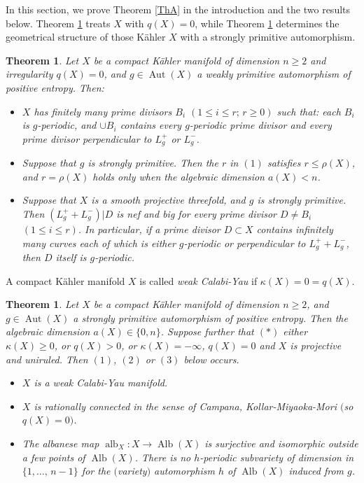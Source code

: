 \documentclass[11pt,a4paper,psamsfonts]{amsart}
\theoremstyle{plain}
\newtheorem{theorem}[thm]{Theorem}
\theoremstyle{definition}
\theoremstyle{remark}
\begin{document}
In this section, we prove Theorem \ref{ThA} in the introduction
and the two results below. Theorem \ref{ThB} treats $X$ with $q(X) = 0$,
while Theorem \ref{ThD} determines the geometrical structure of those K\"ahler $X$ with
a strongly primitive automorphism.

\begin{theorem}\label{ThB}
Let $X$ be a compact K\"ahler manifold of dimension $n \ge 2$ and irregularity
$q(X) = 0$, and $g \in {\operatorname{Aut}}(X)$
a weakly primitive automorphism of positive entropy. Then:
\begin{itemize}
\item[(1)]
$X$ has finitely many prime divisors $B_i$ $(1 \le i \le r; \, r \ge 0)$ such that:
each $B_i$ is $g$-periodic, and
$\cup B_i$ contains every $g$-periodic prime divisor and every prime divisor
perpendicular to $L_g^{+}$ or $L_g^-$.
\item[(2)]
Suppose that $g$ is strongly primitive.
Then the $r$ in $(1)$ satisfies $r \le \rho(X)$,
and $r = \rho(X)$ holds only when the algebraic dimension $a(X) < n$.
\item[(3)]
Suppose that $X$ is a smooth projective threefold, and $g$ is strongly primitive.
Then $(L_g^+ + L_g^-) | D$ is nef and big for every prime divisor $D \ne B_i$ $(1 \le i \le r)$.
In particular, if a prime divisor $D \subset X$ contains infinitely many curves
each of which is either $g$-periodic or perpendicular to $L_g^+ + L_g^-$,
then $D$ itself is $g$-periodic.
\end{itemize}
\end{theorem}

A compact K\"ahler manifold $X$ is called {\it weak Calabi-Yau}
if $\kappa(X) = 0 = q(X)$.

\begin{theorem}\label{ThD}
Let $X$ be a compact K\"ahler manifold of dimension $n \ge 2$, and $g \in {\operatorname{Aut}}(X)$
a strongly primitive automorphism of positive entropy.
Then the algebraic dimension $a(X) \in \{0, n\}$.
Suppose further that $(*)$
either $\kappa(X) \ge 0$, or $q(X) > 0$, or
$\kappa(X) = - \infty$, $q(X) = 0$ and $X$ is projective and uniruled.
Then $(1)$, $(2)$ or $(3)$ below occurs.
\begin{itemize}
\item[(1)]
$X$ is a weak Calabi-Yau manifold.
\item[(2)]
$X$ is rationally connected in the sense of
Campana, Kollar-Miyaoka-Mori $($so $q(X) = 0)$.
\item[(3)]
The albanese map ${\operatorname{alb}}_X : X \to {\operatorname{Alb}}(X)$ is surjective and
isomorphic outside a few points of ${\operatorname{Alb}}(X)$.
There is no $h$-periodic subvariety of dimension in $\{1, \dots, \, n-1\}$
for the $($variety$)$ automorphism $h$ of ${\operatorname{Alb}}(X)$ induced from $g$.
\end{itemize}
\end{theorem}
\end{document}
